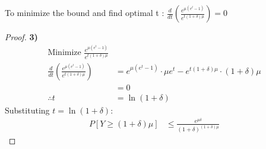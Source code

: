 \begin{claim}
	To minimize the bound and find optimal t : \(\frac{d}{dt} \left( \frac{e^{\mu(e^t - 1)}}{e^{t(1 + \delta)\mu}} \right) = 0\)
\end{claim}
\begin{proof}
	\textbf{3)}
	\begin{align*}
		\text{Minimize } \frac{e^{\mu(e^t - 1)}}{e^{t(1 + \delta)\mu}}                                                                                             \\
		\frac{d}{dt} \left( \frac{e^{\mu(e^t - 1)}}{e^{t(1 + \delta)\mu}} \right) & = e^{\mu(e^t - 1)} \cdot \mu e^t - e^{t(1 + \delta)\mu} \cdot (1 + \delta) \mu \\
		                                                                          & = 0                                                                            \\
		\therefore t                                                              & = \ln(1 + \delta)
	\end{align*}
	Substituting \( t = \ln(1 + \delta) \):
	\begin{align*}
		P[Y \geq (1 + \delta)\mu] & \leq \frac{e^{\mu \delta}}{(1 + \delta)^{(1 + \delta)\mu}}
	\end{align*}
\end{proof}

